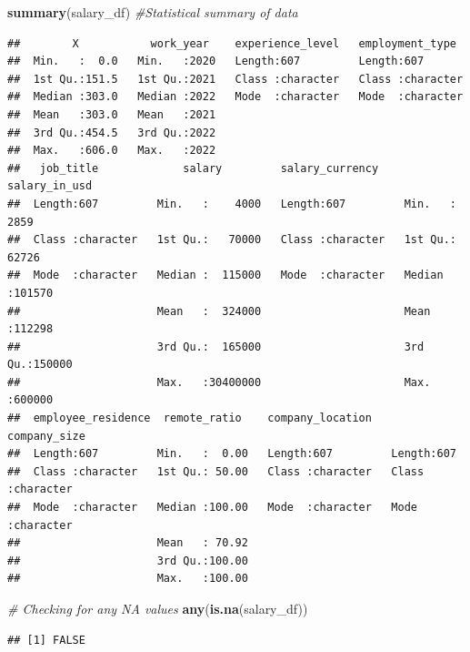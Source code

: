 \documentclass[
]{article}
\newenvironment{Shaded}{\begin{snugshade}}{\end{snugshade}}
\newcommand{\CommentTok}[1]{\textcolor[rgb]{0.56,0.35,0.01}{\textit{#1}}}
\newcommand{\FunctionTok}[1]{\textcolor[rgb]{0.13,0.29,0.53}{\textbf{#1}}}
\newcommand{\NormalTok}[1]{#1}
\begin{document}
\begin{Shaded}
\begin{Highlighting}[]
\FunctionTok{summary}\NormalTok{(salary\_df)  }\CommentTok{\#Statistical summary of data }
\end{Highlighting}
\end{Shaded}

\begin{verbatim}
##        X           work_year    experience_level   employment_type   
##  Min.   :  0.0   Min.   :2020   Length:607         Length:607        
##  1st Qu.:151.5   1st Qu.:2021   Class :character   Class :character  
##  Median :303.0   Median :2022   Mode  :character   Mode  :character  
##  Mean   :303.0   Mean   :2021                                        
##  3rd Qu.:454.5   3rd Qu.:2022                                        
##  Max.   :606.0   Max.   :2022                                        
##   job_title             salary         salary_currency    salary_in_usd   
##  Length:607         Min.   :    4000   Length:607         Min.   :  2859  
##  Class :character   1st Qu.:   70000   Class :character   1st Qu.: 62726  
##  Mode  :character   Median :  115000   Mode  :character   Median :101570  
##                     Mean   :  324000                      Mean   :112298  
##                     3rd Qu.:  165000                      3rd Qu.:150000  
##                     Max.   :30400000                      Max.   :600000  
##  employee_residence  remote_ratio    company_location   company_size      
##  Length:607         Min.   :  0.00   Length:607         Length:607        
##  Class :character   1st Qu.: 50.00   Class :character   Class :character  
##  Mode  :character   Median :100.00   Mode  :character   Mode  :character  
##                     Mean   : 70.92                                        
##                     3rd Qu.:100.00                                        
##                     Max.   :100.00
\end{verbatim}

\begin{Shaded}
\begin{Highlighting}[]
\CommentTok{\# Checking for any NA values}
\FunctionTok{any}\NormalTok{(}\FunctionTok{is.na}\NormalTok{(salary\_df))}
\end{Highlighting}
\end{Shaded}

\begin{verbatim}
## [1] FALSE
\end{verbatim}
\end{document}
